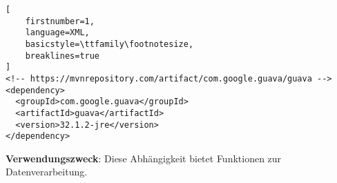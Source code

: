 \begin{tcolorbox}
    [enhanced,
     colback=white,
     colbacktitle=white,
     coltitle=black,
     title=Google Guava,
     toptitle=1.5mm,
     bottomtitle=1.5mm,
     center title,
     breakable,
     segmentation style={solid}
]
\begin{lstlisting}[
    firstnumber=1,
    language=XML,
    basicstyle=\ttfamily\footnotesize,
    breaklines=true
]
<!-- https://mvnrepository.com/artifact/com.google.guava/guava -->
<dependency>
  <groupId>com.google.guava</groupId>
  <artifactId>guava</artifactId>
  <version>32.1.2-jre</version>
</dependency>
\end{lstlisting}
\tcbline
\textbf{Verwendungszweck}: Diese Abhängigkeit bietet Funktionen zur Datenverarbeitung.
\end{tcolorbox}
